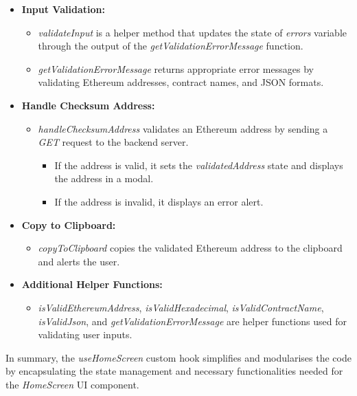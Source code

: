\begin{itemize}
    \item \textbf{Input Validation:}
    \begin{itemize}
        \item \textit{validateInput} is a helper method that updates the state of \textit{errors} variable through the output of the \textit{getValidationErrorMessage} function.
        \item \textit{getValidationErrorMessage} returns appropriate error messages by validating Ethereum addresses, contract names, and JSON formats.
    \end{itemize}

    \item \textbf{Handle Checksum Address:}
    \begin{itemize}
        \item \textit{handleChecksumAddress} validates an Ethereum address by sending a \textit{GET} request to the backend server.
        \begin{itemize}
            \item If the address is valid, it sets the \textit{validatedAddress} state and displays the address in a modal.
            \item If the address is invalid, it displays an error alert.
        \end{itemize}
    \end{itemize}

    \item \textbf{Copy to Clipboard:}
    \begin{itemize}
        \item \textit{copyToClipboard} copies the validated Ethereum address to the clipboard and alerts the user.
    \end{itemize}

    \item \textbf{Additional Helper Functions:}
    \begin{itemize}
        \item \textit{isValidEthereumAddress}, \textit{isValidHexadecimal}, \textit{isValidContractName}, \textit{isValidJson}, and \textit{getValidationErrorMessage} are helper functions used for validating user inputs.
    \end{itemize}
\end{itemize}

In summary, the \textit{useHomeScreen} custom hook simplifies and modularises the code by encapsulating the state management and necessary functionalities needed for the \textit{HomeScreen} UI component.

